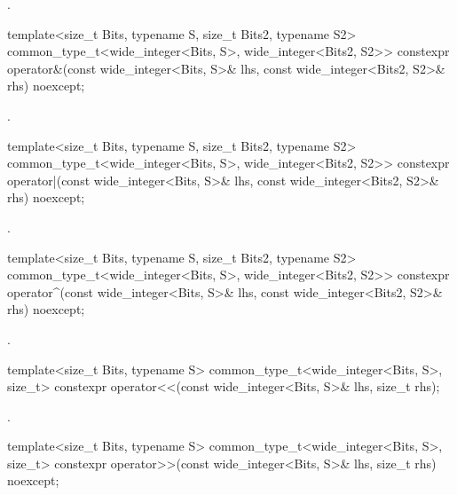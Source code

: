 \begin{itemdescr}
\returns {}.
\end{itemdescr}

\begin{itemdecl}
template<size_t Bits, typename S, size_t Bits2, typename S2>
common_type_t<wide_integer<Bits, S>, wide_integer<Bits2, S2>>
  constexpr operator&(const wide_integer<Bits, S>& lhs, const wide_integer<Bits2, S2>& rhs) noexcept;
\end{itemdecl}

\begin{itemdescr}
\returns {}.
\end{itemdescr}

\begin{itemdecl}
template<size_t Bits, typename S, size_t Bits2, typename S2>
common_type_t<wide_integer<Bits, S>, wide_integer<Bits2, S2>>
  constexpr operator|(const wide_integer<Bits, S>& lhs, const wide_integer<Bits2, S2>& rhs) noexcept;
\end{itemdecl}

\begin{itemdescr}
\returns {}.
\end{itemdescr}

\begin{itemdecl}
template<size_t Bits, typename S, size_t Bits2, typename S2>
common_type_t<wide_integer<Bits, S>, wide_integer<Bits2, S2>>
  constexpr  operator^(const wide_integer<Bits, S>& lhs, const wide_integer<Bits2, S2>& rhs) noexcept;
\end{itemdecl}

\begin{itemdescr}
\returns {}.
\end{itemdescr}

\begin{itemdecl}
template<size_t Bits, typename S>
common_type_t<wide_integer<Bits, S>, size_t>
  constexpr operator<<(const wide_integer<Bits, S>& lhs, size_t rhs);
\end{itemdecl}

\begin{itemdescr}
\returns {}.
\end{itemdescr}

\begin{itemdecl}
template<size_t Bits, typename S>
common_type_t<wide_integer<Bits, S>, size_t>
  constexpr operator>>(const wide_integer<Bits, S>& lhs, size_t rhs) noexcept;
\end{itemdecl}

